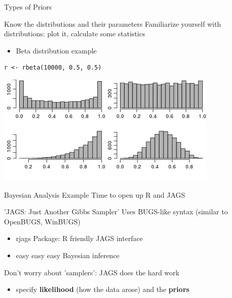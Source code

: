 \documentclass[presentation]{beamer}
\begin{document}
\begin{frame}[fragile,label=sec-24]{Types of Priors}
 \begin{block}{Know the distributions and their parameters}
Familiarize yourself with distributions: plot it, calculate some statistics
\begin{itemize}
\item Beta distribution example
\end{itemize}
\begin{verbatim}
r <- rbeta(10000, 0.5, 0.5)
\end{verbatim}

\includegraphics[width=.9\linewidth]{beta.jpg}
\end{block}
\end{frame}
\begin{frame}[label=sec-25]{Bayesian Analysis Example}
Time to open up R and JAGS
\begin{block}{'JAGS: Just Another Gibbs Sampler'}
Uses BUGS-like syntax (similar to OpenBUGS, WinBUGS)
\begin{itemize}
\item rjags Package: R friendly JAGS interface
\item easy easy easy Bayesian inference
\end{itemize}
Don't worry about 'samplers': JAGS does the hard work
\begin{itemize}
\item specify \textbf{likelihood} (how the data arose) and the \textbf{priors}
\end{itemize}
\end{block}
\end{frame}
\end{document}
